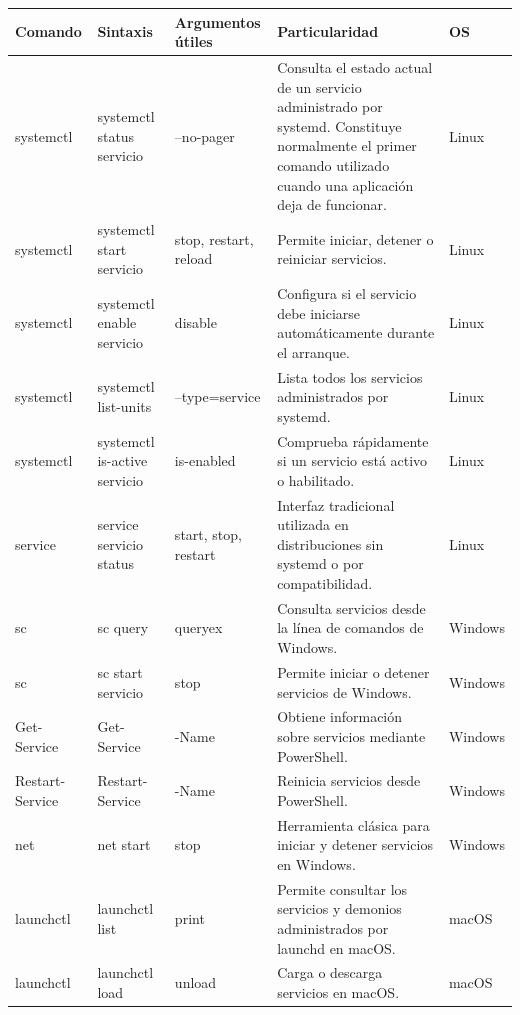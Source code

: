 \documentclass[a4paper,10pt]{article}
\begin{document}
\begin{longtable}{|p{2.8cm}|p{3.2cm}|p{4cm}|p{5.4cm}|p{1.5cm}|}

\hline
Comando &
Sintaxis &
Argumentos útiles &
Particularidad &
OS
\\
\hline
\endhead

systemctl &
systemctl status servicio &
--no-pager &
Consulta el estado actual de un servicio administrado por systemd. Constituye normalmente el primer comando utilizado cuando una aplicación deja de funcionar. &
Linux
\\
\hline

systemctl &
systemctl start servicio &
stop, restart, reload &
Permite iniciar, detener o reiniciar servicios. &
Linux
\\
\hline

systemctl &
systemctl enable servicio &
disable &
Configura si el servicio debe iniciarse automáticamente durante el arranque. &
Linux
\\
\hline

systemctl &
systemctl list-units &
--type=service &
Lista todos los servicios administrados por systemd. &
Linux
\\
\hline

systemctl &
systemctl is-active servicio &
is-enabled &
Comprueba rápidamente si un servicio está activo o habilitado. &
Linux
\\
\hline

service &
service servicio status &
start, stop, restart &
Interfaz tradicional utilizada en distribuciones sin systemd o por compatibilidad. &
Linux
\\
\hline

sc &
sc query &
queryex &
Consulta servicios desde la línea de comandos de Windows. &
Windows
\\
\hline

sc &
sc start servicio &
stop &
Permite iniciar o detener servicios de Windows. &
Windows
\\
\hline

Get-Service &
Get-Service &
-Name &
Obtiene información sobre servicios mediante PowerShell. &
Windows
\\
\hline

Restart-Service &
Restart-Service &
-Name &
Reinicia servicios desde PowerShell. &
Windows
\\
\hline

net &
net start &
stop &
Herramienta clásica para iniciar y detener servicios en Windows. &
Windows
\\
\hline

launchctl &
launchctl list &
print &
Permite consultar los servicios y demonios administrados por launchd en macOS. &
macOS
\\
\hline

launchctl &
launchctl load &
unload &
Carga o descarga servicios en macOS. &
macOS
\\
\hline

\end{longtable}
\end{document}
